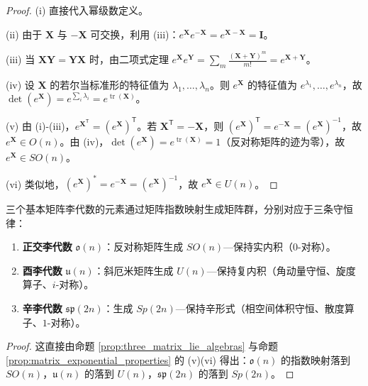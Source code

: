 \begin{proof}
(i) 直接代入幂级数定义。

(ii) 由于 $\mathbf{X}$ 与 $-\mathbf{X}$ 可交换，利用 (iii)：$e^{\mathbf{X}} e^{-\mathbf{X}} = e^{\mathbf{X}-\mathbf{X}} = \mathbf{I}$。

(iii) 当 $\mathbf{XY} = \mathbf{YX}$ 时，由二项式定理 $e^{\mathbf{X}} e^{\mathbf{Y}} = \sum_{m} \frac{(\mathbf{X}+\mathbf{Y})^m}{m!} = e^{\mathbf{X}+\mathbf{Y}}$。

(iv) 设 $\mathbf{X}$ 的若尔当标准形的特征值为 $\lambda_1, \dots, \lambda_n$。则 $e^{\mathbf{X}}$ 的特征值为 $e^{\lambda_1}, \dots, e^{\lambda_n}$，故 $\det(e^{\mathbf{X}}) = e^{\sum_i \lambda_i} = e^{\operatorname{tr}(\mathbf{X})}$。

(v) 由 (i)-(iii)，$e^{\mathbf{X}^{\mathsf T}} = (e^{\mathbf{X}})^{\mathsf T}$。若 $\mathbf{X}^{\mathsf T} = -\mathbf{X}$，则 $(e^{\mathbf{X}})^{\mathsf T} = e^{-\mathbf{X}} = (e^{\mathbf{X}})^{-1}$，故 $e^{\mathbf{X}} \in O(n)$。由 (iv)，$\det(e^{\mathbf{X}}) = e^{\operatorname{tr}(\mathbf{X})} = 1$（反对称矩阵的迹为零），故 $e^{\mathbf{X}} \in SO(n)$。

(vi) 类似地，$(e^{\mathbf{X}})^* = e^{-\mathbf{X}} = (e^{\mathbf{X}})^{-1}$，故 $e^{\mathbf{X}} \in U(n)$。
\end{proof}

\begin{theorem}[李代数与守恒律的对应]\label{thm:lie_algebra_conservation}
三个基本矩阵李代数的元素通过矩阵指数映射生成矩阵群，分别对应于三条守恒律：
\begin{enumerate}[label=(\roman*)]
    \item \textbf{正交李代数} $\mathfrak{o}(n)$：反对称矩阵生成 $SO(n)$---保持实内积（$0$-对称）。
    \item \textbf{酉李代数} $\mathfrak{u}(n)$：斜厄米矩阵生成 $U(n)$---保持复内积（角动量守恒、旋度算子、$i$-对称）。
    \item \textbf{辛李代数} $\mathfrak{sp}(2n)$：生成 $Sp(2n)$---保持辛形式（相空间体积守恒、散度算子、$1$-对称）。
\end{enumerate}
\end{theorem}

\begin{proof}
这直接由命题 \ref{prop:three_matrix_lie_algebras} 与命题 \ref{prop:matrix_exponential_properties} 的 (v)(vi) 得出：$\mathfrak{o}(n)$ 的指数映射落到 $SO(n)$，$\mathfrak{u}(n)$ 的落到 $U(n)$，$\mathfrak{sp}(2n)$ 的落到 $Sp(2n)$。
\end{proof}

